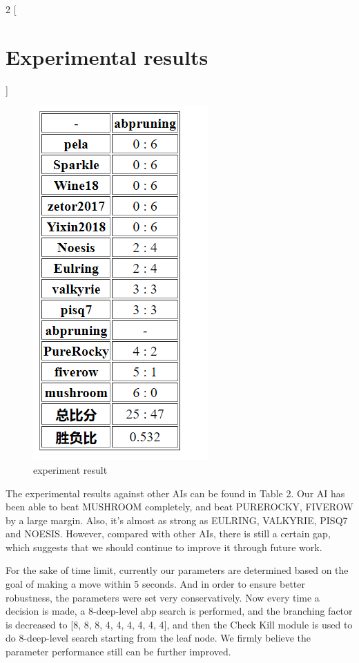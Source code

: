 \documentclass[a4paper, 12pt]{article} %
\begin{document}
\begin{multicols}{2}
  [
      \section{Experimental results}
  ]
    \begin{figure}[H]
    \centering
    \includegraphics[scale=0.45]{result.png}
    \caption{experiment result}
    \label{figure}
    \end{figure}
  	The experimental results against other AIs can be found in Table 2. Our AI has been able to beat MUSHROOM completely, and beat PUREROCKY, FIVEROW by a large margin. Also, it's almost as strong as EULRING, VALKYRIE, PISQ7 and NOESIS. However, compared with other AIs, there is still a certain gap, which suggests that we should continue to improve it through future work.
  
 	For the sake of time limit, currently our parameters are determined based on the goal of making a move within 5 seconds. And in order to ensure better robustness, the parameters were set very conservatively. Now every time a decision is made, a  8-deep-level abp search is performed, and the branching factor is decreased to [8, 8, 8, 4, 4, 4, 4, 4, 4], and then the Check Kill module is used to do 8-deep-level search starting from the leaf node. We firmly believe the parameter performance still can be further improved.

\end{multicols}
\end{document}
